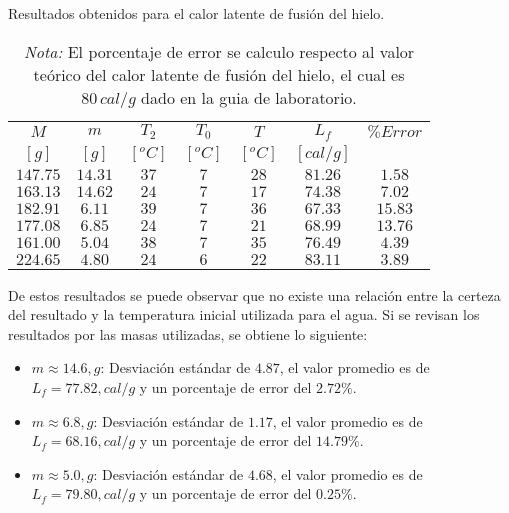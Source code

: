 \documentclass[10pt]{article}
\begin{document}
\begin{multicols*}{2}
        \begin{table}[H]
            \centering
            \caption{Resultados obtenidos para el calor latente de fusión del hielo.}
            \begin{tabular}{ccccccc}
                \hline\hline
                \textbf{$M$} & \textbf{$m$} & \textbf{$T_2$} & \textbf{$T_0$} & \textbf{$T$} & \textbf{$L_f$} & \textbf{$\% Error$} \\
                \small $[g]$ & \small $[g]$ & \small $[^oC]$ & \small $[^oC]$ & \small $[^oC]$ & \small $[cal / g]$ &  \\
                \hline\hline
                $147.75$ & $14.31$ & $37$ & $7$ & $28$ & $81.26$ & $1.58$ \\
                $163.13$ & $14.62$ & $24$ & $7$ & $17$ & $74.38$ & $7.02$ \\
                \hline
                $182.91$ & $6.11$ & $39$ & $7$ & $36$ & $67.33$ & $15.83$ \\
                $177.08$ & $6.85$ & $24$ & $7$ & $21$ & $68.99$ & $13.76$ \\
                \hline
                $161.00$ & $5.04$ & $38$ & $7$ & $35$ & $76.49$ & $4.39$ \\
                $224.65$ & $4.80$ & $24$ & $6$ & $22$ & $83.11$ & $3.89$ \\
                \hline
            \end{tabular}
            \caption*{\textit{Nota:} El porcentaje de error se calculo respecto al valor teórico del calor latente de fusión del hielo, el cual es $80 \, cal / g$ dado en la guia de laboratorio.}
            \label{tab:calor_latente}
        \end{table}

        De estos resultados se puede observar que no existe una relación entre la certeza del resultado y la temperatura inicial utilizada para el agua. Si se revisan los resultados por las masas utilizadas, se obtiene lo siguiente:

        \begin{itemize}
        \item $m \approx 14.6 , g$: Desviación estándar de $4.87$, el valor promedio es de $L_f = 77.82 , cal / g$ y un porcentaje de error del $2.72 \%$.
        \item $m \approx 6.8 , g$: Desviación estándar de $1.17$, el valor promedio es de $L_f = 68.16 , cal / g$ y un porcentaje de error del $14.79 \%$.
        \item $m \approx 5.0 , g$: Desviación estándar de $4.68$, el valor promedio es de $L_f = 79.80 , cal / g$ y un porcentaje de error del $0.25 \%$.
        \end{itemize}


\end{multicols*}
\end{document}
